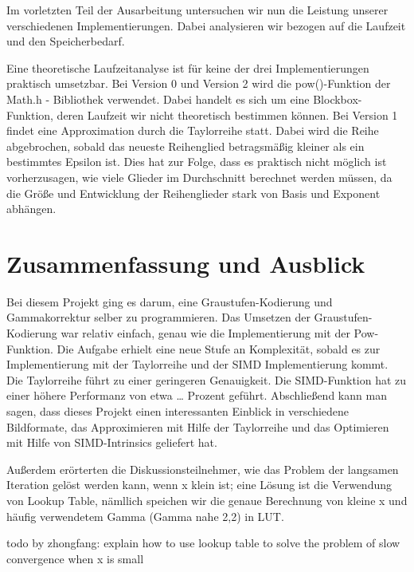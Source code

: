 \documentclass[course=erap]{aspdoc}
\begin{document}
\par
Im vorletzten Teil der Ausarbeitung untersuchen wir nun die Leistung unserer verschiedenen Implementierungen. Dabei analysieren wir bezogen auf die Laufzeit und den Speicherbedarf.

\par
Eine theoretische Laufzeitanalyse ist für keine der drei Implementierungen praktisch umsetzbar. Bei Version 0 und Version 2 wird die pow()-Funktion der Math.h - Bibliothek verwendet. Dabei handelt es sich um eine Blockbox-Funktion, deren Laufzeit wir nicht theoretisch bestimmen können. Bei Version 1 findet eine Approximation durch die Taylorreihe statt. Dabei wird die Reihe abgebrochen, sobald das neueste Reihenglied betragsmäßig kleiner als ein bestimmtes Epsilon ist. Dies hat zur Folge, dass es praktisch nicht möglich ist vorherzusagen, wie viele Glieder im Durchschnitt berechnet werden müssen, da die Größe und Entwicklung der Reihenglieder stark von Basis und Exponent abhängen.

\section{Zusammenfassung und Ausblick}

\par
Bei diesem Projekt ging es darum, eine Graustufen-Kodierung und Gammakorrektur selber zu programmieren. Das Umsetzen der Graustufen-Kodierung war relativ einfach, genau wie die Implementierung mit der Pow-Funktion. Die Aufgabe erhielt eine neue Stufe an Komplexität, sobald es zur Implementierung mit der Taylorreihe und der SIMD Implementierung kommt. Die Taylorreihe führt zu einer geringeren Genauigkeit. Die SIMD-Funktion hat zu einer höhere Performanz von etwa … Prozent geführt. Abschließend kann man sagen, dass dieses Projekt einen interessanten Einblick in verschiedene Bildformate, das Approximieren mit Hilfe der Taylorreihe und das Optimieren mit Hilfe von SIMD-Intrinsics geliefert hat.

\par
Außerdem erörterten die Diskussionsteilnehmer, wie das Problem der langsamen Iteration gelöst werden kann, wenn x klein ist; eine Lösung ist die Verwendung von Lookup Table\cite{jungck2011packetC}, nämllich speichen wir die genaue Berechnung von kleine x und häufig verwendetem Gamma (Gamma nahe 2,2) in LUT.

\par
todo by zhongfang: explain how to use lookup table to solve the problem of slow convergence when x is small
\end{document}
